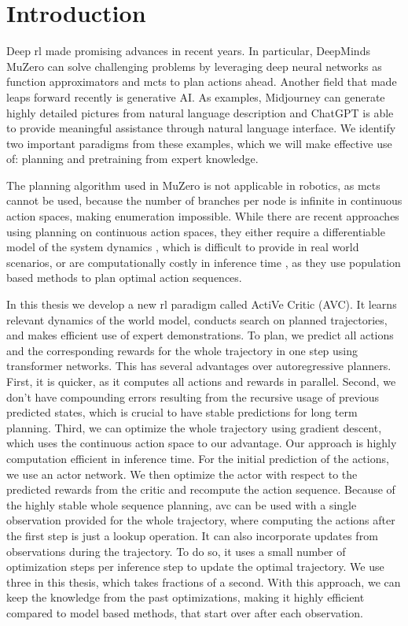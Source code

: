 \chapter{Introduction}
\label{chapter:Introduction}
Deep \ac{rl} made promising advances in recent years. In particular, DeepMinds MuZero \cite{MUZero} can solve challenging problems by leveraging deep neural networks as function 
approximators and \ac{mcts} to plan actions ahead. 
Another field that made leaps forward recently is generative AI. As examples, Midjourney \cite{midjourney} 
can generate highly detailed pictures from natural 
language description and ChatGPT \cite{cite:ChatGPT} is able to provide meaningful assistance through natural language interface. We identify two important paradigms from these 
examples, which we will make effective use of: planning and pretraining from expert knowledge. 

The planning algorithm used in MuZero is not applicable in robotics, as \ac{mcts} cannot be used, because the number of branches per node is infinite in continuous action spaces, 
making enumeration impossible. While there are recent approaches 
using planning on continuous action spaces, they either require a differentiable model of the system dynamics \cite{Manna2022} \cite{Lee_Jeon_Kim_Kim_2020}, which is difficult to provide in real world scenarios,
or are computationally costly in inference time \cite{hafner2018planet}, as they use population based methods to plan optimal action sequences. 

In this thesis we develop a new \ac{rl} 
paradigm called ActiVe Critic (AVC). It learns relevant dynamics of the world model, conducts search on planned trajectories, 
and makes efficient use of expert demonstrations. To plan, we predict all actions and the corresponding rewards for the whole trajectory in one step 
using transformer networks. This has several advantages over autoregressive planners. First, it is quicker, as it computes all actions and rewards in 
parallel. Second, we don't have compounding errors resulting from the recursive usage of previous predicted states, which is crucial to have 
stable predictions for long term planning. Third, we can optimize the whole trajectory using gradient descent, which uses the 
continuous action space to our advantage. Our approach is highly computation efficient in inference time. For the initial prediction of the 
actions, we use an actor network. We then optimize the actor with respect to the predicted rewards from the critic and recompute the action sequence. 
Because of the highly stable whole sequence planning, \ac{avc} can be used with a single observation provided 
for the whole trajectory, where computing the actions after the first step is just a lookup operation. It can also incorporate updates from observations during 
the trajectory. To do so, it uses a small number of optimization steps per inference step to update the 
optimal trajectory. We use three in this thesis, which takes fractions of a second. With this approach, we can keep the knowledge from the past optimizations, making it highly efficient compared to model based methods, that start over after 
each observation. 

